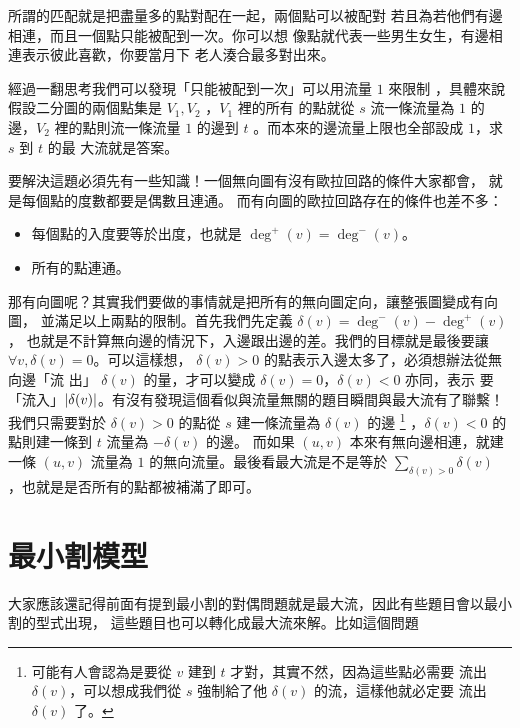 \documentclass[a4paper,12pt]{book}
\begin{document}
所謂的匹配就是把盡量多的點對配在一起，兩個點可以被配對
若且為若他們有邊相連，而且一個點只能被配到一次。你可以想
像點就代表一些男生女生，有邊相連表示彼此喜歡，你要當月下
老人湊合最多對出來。

經過一翻思考我們可以發現「只能被配到一次」可以用流量 $1$ 來限制
，具體來說假設二分圖的兩個點集是 $V_1, V_2$ ，$V_1$ 裡的所有
的點就從 $s$ 流一條流量為 $1$ 的邊，$V_2$ 裡的點則流一條流量 $1$ 
的邊到 $t$ 。而本來的邊流量上限也全部設成 $1$，求 $s$ 到 $t$ 的最
大流就是答案。

要解決這題必須先有一些知識！一個無向圖有沒有歐拉回路的條件大家都會，
就是每個點的度數都要是偶數且連通。 而有向圖的歐拉回路存在的條件也差不多：
\begin{itemize}
  \item 每個點的入度要等於出度，也就是 $\deg^+(v) = \deg^-(v)$。
  \item 所有的點連通。
\end{itemize}
那有向圖呢？其實我們要做的事情就是把所有的無向圖定向，讓整張圖變成有向圖，
並滿足以上兩點的限制。首先我們先定義 $\delta(v) = \deg^-(v) - \deg^+(v)$，
也就是不計算無向邊的情況下，入邊跟出邊的差。我們的目標就是最後要讓 $\forall v, \delta(v) = 0
$。可以這樣想， $\delta(v) > 0$ 的點表示入邊太多了，必須想辦法從無向邊「流
出」 $\delta(v)$ 的量，才可以變成 $\delta(v) = 0$，$\delta(v) < 0$ 亦同，表示
要「流入」$\lvert \delta(v) \rvert$。有沒有發現這個看似與流量無關的題目瞬間與最大流有了聯繫！
我們只需要對於 $\delta(v) > 0$ 的點從 $s$ 建一條流量為 $\delta(v)$ 的邊
\footnote{可能有人會認為是要從 $v$ 建到 $t$ 才對，其實不然，因為這些點必需要
  流出 $\delta(v)$，可以想成我們從 $s$ 強制給了他 $\delta(v)$ 的流，這樣他就必定要
  流出 $\delta(v)$ 了。}
，$\delta(v) < 0$ 的點則建一條到 $t$ 流量為 $-\delta(v)$ 的邊。
而如果 $(u, v)$ 本來有無向邊相連，就建
一條 $(u, v)$ 流量為 $1$ 的無向流量。最後看最大流是不是等於 $\sum_{\delta(v) > 0} \delta(v)$ 
，也就是是否所有的點都被補滿了即可。

\section{最小割模型}
大家應該還記得前面有提到最小割的對偶問題就是最大流，因此有些題目會以最小割的型式出現，
這些題目也可以轉化成最大流來解。比如這個問題

\end{document}
